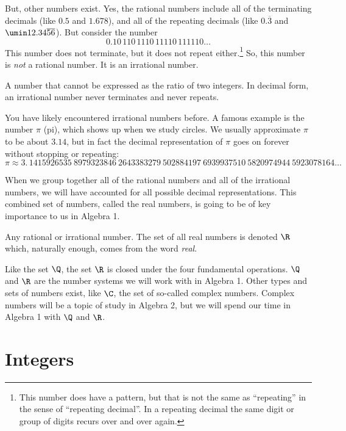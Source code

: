 But, other numbers exist. Yes, the rational numbers include all of the terminating decimals (like $0.5$ and $1.678$), and all of the repeating decimals (like $0.\overline{3}$ and $\umin12.34\overline{56}$). But consider the number \[0.10\,110\,1110\,11110\,111110\ldots\] This number does not terminate, but it does not repeat either.\footnote{This number does have a pattern, but that is not the same as ``repeating'' in the sense of ``repeating decimal''. In a repeating decimal the same digit or group of digits recurs over and over again.} So, this number is \textit{not} a rational number. It is an \gls{irrational number}.

\begin{boxdef}
A number that cannot be expressed as the ratio of two integers. In decimal form, an irrational number never terminates and never repeats.
\end{boxdef}

You have likely encountered irrational numbers before. A famous example is the number $\pi$ (pi), which shows up when we study circles. We usually approximate $\pi$ to be about $3.14$, but in fact the decimal representation of $\pi$ goes on forever without stopping or repeating: \[\pi \approx 3. \, 1415926535 ~ 8979323846 ~ 2643383279 ~ 502884197 ~ 6939937510 ~ 5820974944 ~ 5923078164\ldots\]

When we group together all of the rational numbers and all of the irrational numbers, we will have accounted for all possible decimal representations. This combined set of numbers, called the \glspl{real number}, is going to be of key importance to us in Algebra 1.

\begin{boxdef}
Any rational or irrational number. The set of all real numbers is denoted $\R$ which, naturally enough, comes from the word \textit{real}.
\end{boxdef}

Like the set $\Q$, the set $\R$ is closed under the four fundamental operations. $\Q$ and $\R$ are the number systems we will work with in Algebra 1. Other types and sets of numbers exist, like $\C$, the set of so-called \glspl{complex number}. Complex numbers will be a topic of study in Algebra 2, but we will spend our time in Algebra 1 with $\Q$ and $\R$.


\section{Integers}
\label{sec:integers}


